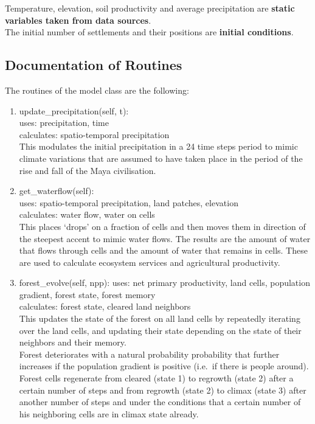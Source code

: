 Temperature, elevation, soil productivity and average precipitation are \textbf{static variables taken from data sources}. \\
The initial number of settlements and their positions are \textbf{initial conditions}. \par
\subsection{Documentation of Routines}
The routines of the model class are the following:
\begin{enumerate}
	\item update_precipitation(self, t):\\
		uses: precipitation, time \\
		calculates: spatio-temporal precipitation \\
		This modulates the initial precipitation in a 
		24 time steps period to mimic climate variations that
		are assumed to have taken place in the period of the
		rise and fall of the Maya civilisation.
	\item get_waterflow(self):\\
		uses: spatio-temporal precipitation, land patches, elevation \\
		calculates: water flow, water on cells\\
		This places `drops' on a fraction of cells and then moves them in direction of the steepest accent to mimic water flows. The results are the amount of water that flows through cells and the amount of water that remains in cells. These are used to calculate ecosystem services and agricultural productivity.
	\item forest_evolve(self, npp):
		uses: net primary productivity, land cells, population gradient, forest state, forest memory \\
		calculates: forest state, cleared land neighbors \\
		This updates the state of the forest on all land cells by repeatedly iterating over the land cells, and updating their state depending on the state of their neighbors and their memory.\\
		Forest deteriorates with a natural probability probability that further increases if the population gradient is positive (i.e.\ if there is people around).\\
		Forest cells regenerate from cleared (state 1) to regrowth (state 2) after a certain number of steps and from regrowth (state 2) to climax (state 3) after another number of steps and under the conditions that a certain number of his neighboring cells are in climax state already. \\

\end{enumerate}
